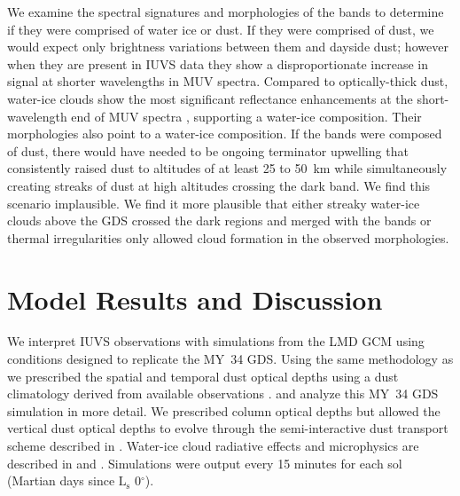 \documentclass[draft]{agujournal2019}
\begin{document}
We examine the spectral signatures and morphologies of the bands to determine if they were comprised of water ice or dust. If they were comprised of dust, we would expect only brightness variations between them and dayside dust; however when they are present in IUVS data they show a disproportionate increase in signal at shorter wavelengths in MUV spectra. Compared to optically-thick dust, water-ice clouds show the most significant reflectance enhancements at the short-wavelength end of MUV spectra \cite{Willame17, Wolff19}, supporting a water-ice composition. Their morphologies also point to a water-ice composition. If the bands were composed of dust, there would have needed to be ongoing terminator upwelling that consistently raised dust to altitudes of at least 25 to 50~km while simultaneously creating streaks of dust at high altitudes crossing the dark band. We find this scenario implausible. We find it more plausible that either streaky water-ice clouds above the GDS crossed the dark regions and merged with the bands or thermal irregularities only allowed cloud formation in the observed morphologies.

\section{Model Results and Discussion}
We interpret IUVS observations with simulations from the LMD GCM \cite{Forget99} using conditions designed to replicate the MY~34 GDS. Using the same methodology as  we prescribed the spatial and temporal dust optical depths using a dust climatology derived from available observations \cite{Montabone15}.  and  analyze this MY~34 GDS simulation in more detail. We prescribed column optical depths but allowed the vertical dust optical depths to evolve through the semi-interactive dust transport scheme described in . Water-ice cloud radiative effects and microphysics are described in  and . Simulations were output every 15 minutes for each sol (Martian days since $\mathrm{L_s}$ 0$^\circ$).
\end{document}
